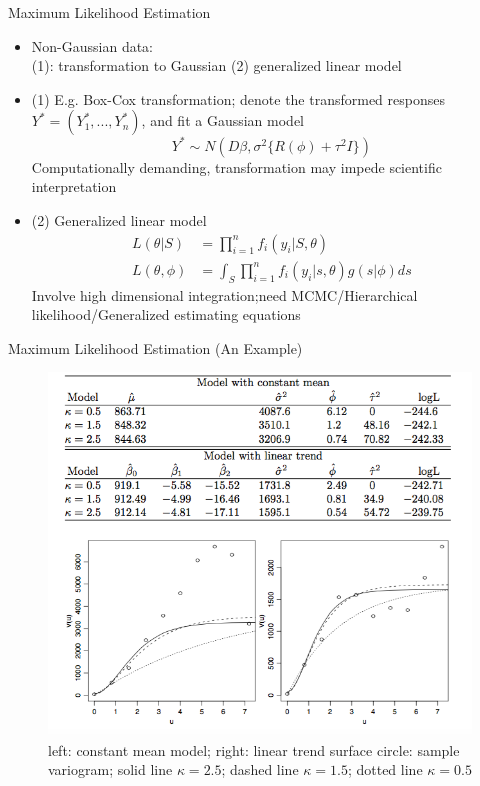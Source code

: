 \documentclass{beamer}
\begin{document}
\begin{frame}{Maximum Likelihood Estimation}
	\begin{itemize}
		\item Non-Gaussian data: \\ 
		(1): transformation to Gaussian (2)  generalized linear model 
		\item   (1) E.g. Box-Cox transformation; denote the transformed responses $Y^{\ast} = (Y_1^{\ast}, ..., Y_n^{\ast})$, and fit a Gaussian model 
		$$Y^{\ast} \sim N(D\beta, \sigma^2 \{R(\phi) + \tau^2I\}) $$
		Computationally demanding, transformation may impede scientific interpretation
		\item (2) Generalized linear model 
		\begin{align*}  %
		L(\theta|S) &= \prod_{i=1}^n f_i(y_i|S, \theta)\\
		L(\theta, \phi) &= \int_ S \prod_{i=1}^n f_i(y_i|s, \theta)g(s|\phi) ds
		\end{align*}
		Involve high dimensional integration;need MCMC/Hierarchical likelihood/Generalized estimating equations
	\end{itemize}
\end{frame}


\begin{frame}{Maximum Likelihood Estimation (An Example)} %
	\begin{figure}
		\centering
		\includegraphics[scale = 0.35]{Images/Pic1}
		\caption{ { \scriptsize left: constant mean model; right: linear trend surface \newline  circle: sample  variogram; solid line $\kappa = 2.5$; dashed line $\kappa = 1.5$; dotted line $\kappa = 0.5$}}
	\end{figure}
\end{frame}
\end{document}
